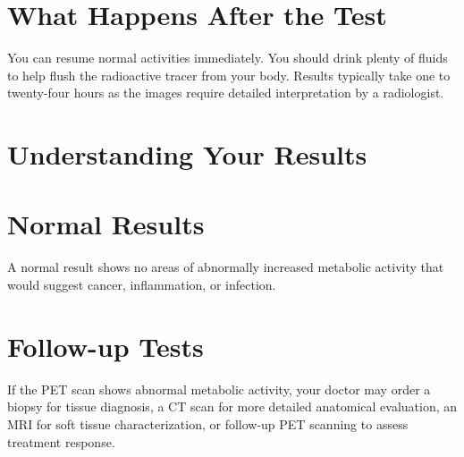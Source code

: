 \section*{What Happens After the Test}
You can resume normal activities immediately. You should drink plenty of fluids to help flush the radioactive tracer from your body. Results typically take one to twenty-four hours as the images require detailed interpretation by a radiologist.

\section*{Understanding Your Results}

\section*{Normal Results}
A normal result shows no areas of abnormally increased metabolic activity that would suggest cancer, inflammation, or infection.

\section*{Follow-up Tests}
If the PET scan shows abnormal metabolic activity, your doctor may order a biopsy for tissue diagnosis, a CT scan for more detailed anatomical evaluation, an MRI for soft tissue characterization, or follow-up PET scanning to assess treatment response.
\clearpage
